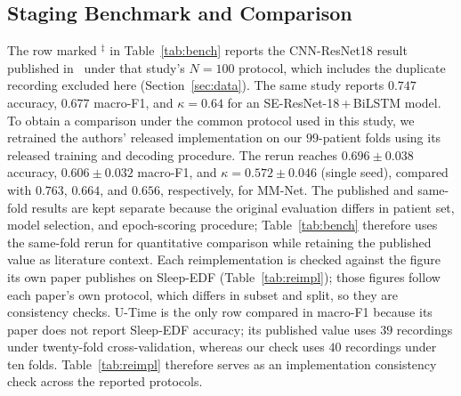 \documentclass[a4paper,fleqn]{cas-sc}
\newcommand{\mmAcc}{0.763}
\newcommand{\mmMf}{0.664}
\newcommand{\mmK}{0.656}
\begin{document}
\subsection{Staging Benchmark and Comparison}
The row marked $^{\ddagger}$ in Table~\ref{tab:bench} reports the CNN-ResNet18 result published
in~\cite{bose2026gap} under that study's $N=100$ protocol, which includes the
duplicate recording excluded here (Section~\ref{sec:data}). The same study reports
$0.747$ accuracy, $0.677$ macro-F1, and $\kappa=0.64$ for an
SE-ResNet-18\,+\,BiLSTM model. To obtain a comparison under the common protocol used
in this study, we retrained the authors' released implementation on our $99$-patient
folds using its released training and decoding procedure. The rerun reaches
$0.696 \pm 0.038$ accuracy, $0.606 \pm 0.032$ macro-F1, and
$\kappa=0.572 \pm 0.046$ (single seed), compared with $\mmAcc$, $\mmMf$, and
$\mmK$, respectively, for MM-Net. The published and same-fold results are kept
separate because the original evaluation differs in patient set, model selection,
and epoch-scoring procedure; Table~\ref{tab:bench} therefore uses the same-fold
rerun for quantitative comparison while retaining the published value as
literature context. Each reimplementation is checked against the figure its own paper
publishes on Sleep-EDF (Table~\ref{tab:reimpl}); those figures follow each paper's own protocol, which
differs in subset and split, so they are consistency checks.
U-Time is the only row compared
in macro-F1 because its paper does not report Sleep-EDF accuracy; its published value
uses $39$ recordings under twenty-fold cross-validation, whereas our check uses
$40$ recordings under ten folds. Table~\ref{tab:reimpl} therefore serves as an
implementation consistency check across the reported protocols.
\end{document}
